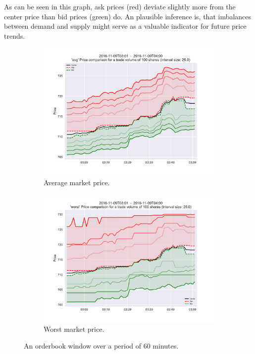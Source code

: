 As can be seen in this graph, ask prices (red) deviate slightly more from the center price than bid prices (green) do. An plausible inference is, that imbalances between demand and supply might serve as a valuable indicator for future price trends.

\begin{figure}[ht]
	\centering
	\begin{subfigure}[t]{0.5\textwidth}
        		\centering
        		\includegraphics[width=\textwidth]{content/drawings/orderbook_window17}
        		\caption{Average market price.}
		\label{fig:orderbookwindow:avg}
    	\end{subfigure}%
	\begin{subfigure}[t]{0.5\textwidth}
        		\centering
        		\includegraphics[width=\textwidth]{content/drawings/orderbook_window17_worst}
        		\caption{Worst market price.}
		\label{fig:orderbookwindow:worst}
    	\end{subfigure}%
	
	\caption{An orderbook window over a period of 60 minutes.}
	\label{fig:orderbookwindow}
\end{figure}

